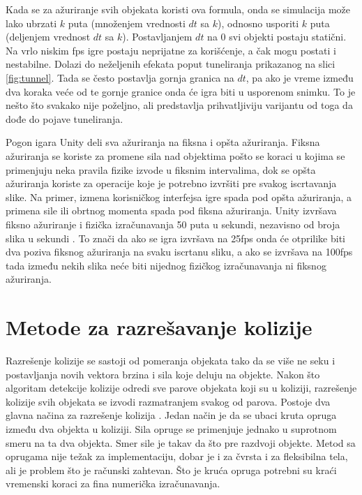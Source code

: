 \documentclass[12pt,oneside]{memoir}
\begin{document}
Kada se za ažuriranje svih objekata koristi ova formula, onda se simulacija može lako ubrzati $k$ puta
(množenjem vrednosti $dt$ sa $k$), odnosno usporiti $k$ puta (deljenjem vrednost $dt$ sa $k$).
Postavljanjem $dt$ na 0 svi objekti postaju statični. 
Na vrlo niskim fps igre postaju neprijatne za korišćenje, a čak mogu postati i nestabilne.
Dolazi do neželjenih efekata poput tuneliranja prikazanog na slici \ref{fig:tunnel}.
Tada se često postavlja gornja granica na $dt$, pa 
ako je vreme između dva koraka veće od te gornje granice onda će igra biti u usporenom snimku.
To je nešto što svakako nije poželjno, ali predstavlja prihvatljiviju varijantu od toga da dođe do pojave tuneliranja.

Pogon igara Unity deli sva ažuriranja na fiksna i opšta ažuriranja. 
Fiksna ažuriranja se koriste za promene sila nad objektima 
pošto se koraci u kojima se primenjuju neka pravila fizike izvode u fiksnim intervalima, 
dok se opšta ažuriranja koriste za operacije koje je potrebno izvršiti pre svakog iscrtavanja slike. 
Na primer, izmena korisničkog interfejsa igre spada pod opšta ažuriranja, a primena sile ili obrtnog momenta spada pod fiksna ažuriranja.
Unity izvršava fiksno ažuriranje i fizička izračunavanja 50 puta u sekundi, nezavisno od broja slika u sekundi \cite{unity}.
To znači da ako se igra izvršava na 25fps onda će otprilike biti dva poziva fiksnog ažuriranja na svaku iscrtanu sliku,
a ako se izvršava na 100fps tada između nekih slika neće biti nijednog fizičkog izračunavanja ni fiksnog ažuriranja.

\section{Metode za razrešavanje kolizije}
\label{sec:razresenje}

Razrešenje kolizije se sastoji od
pomeranja objekata tako da se više ne seku i postavljanja novih vektora brzina i sila koje deluju na objekte.
Nakon što algoritam detekcije kolizije odredi sve parove objekata koji su u koliziji, 
razrešenje kolizije svih objekata se izvodi razmatranjem svakog od parova.
Postoje dva glavna načina za razrešenje kolizija \cite{Moore}.
Jedan način je da se ubaci kruta opruga između dva objekta u koliziji.
Sila opruge se primenjuje jednako u suprotnom smeru na ta dva objekta.
Smer sile je takav da što pre razdvoji objekte. Metod sa oprugama nije težak 
za implementaciju, dobar je i za čvrsta i za fleksibilna tela, ali je problem što je računski zahtevan. 
Što je kruća opruga potrebni su kraći vremenski koraci za fina numerička izračunavanja.
\end{document}

